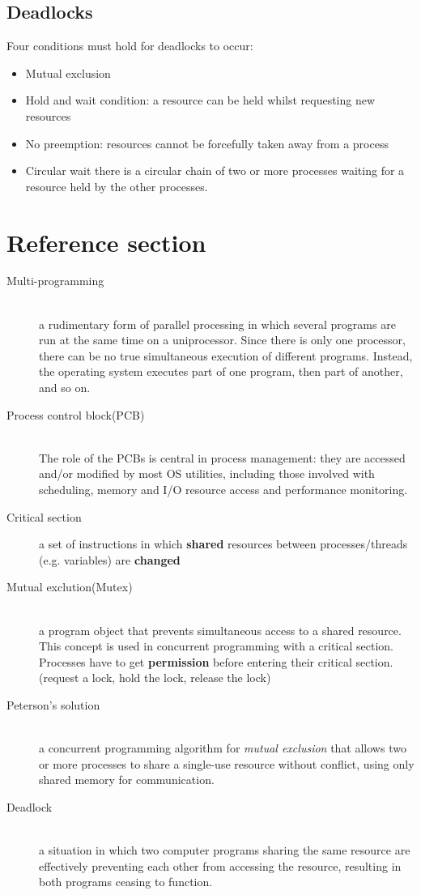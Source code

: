 \documentclass{article}
\begin{document}
\subsection{Deadlocks}
\begin{flushleft}
Four conditions must hold for deadlocks to occur:
\begin{itemize}
	\item Mutual exclusion
	\item Hold and wait condition: a resource can be held whilst requesting new resources
	\item No preemption: resources cannot be forcefully taken away from a process
	\item Circular wait there is a circular chain of two or more processes waiting for a resource held by the other processes.	
\end{itemize}
\end{flushleft}

\pagebreak
\section*{Reference section} \label{sec:reference}
\begin{description}
	\item[Multi-programming] \hfill \\ a rudimentary form of parallel processing in which several programs are run at the same time on a uniprocessor. Since there is only one processor, there can be no true simultaneous execution of different programs. Instead, the operating system executes part of one program, then part of another, and so on.
	\item[Process control block(PCB)] \hfill \\ The role of the PCBs is central in process management: they are accessed and/or modified by most OS utilities, including those involved with scheduling, memory and I/O resource access and performance monitoring. 
	\item [Critical section] a set of instructions in which \textbf{shared} resources between processes/threads (e.g. variables) are \textbf{changed}
	\item [Mutual exclution(Mutex)] \hfill \\ a program object that prevents simultaneous access to a shared resource. This concept is used in concurrent programming with a critical section. Processes have to get \textbf{permission} before entering their critical section. (request a lock, hold the lock, release the lock)
	\item [Peterson's solution] \hfill \\ a concurrent programming algorithm for \textit{mutual exclusion} that allows two or more processes to share a single-use resource without conflict, using only shared memory for communication.
	\item [Deadlock] \hfill \\ a situation in which two computer programs sharing the same resource are effectively preventing each other from accessing the resource, resulting in both programs ceasing to function.
\end{description}
\end{document}
